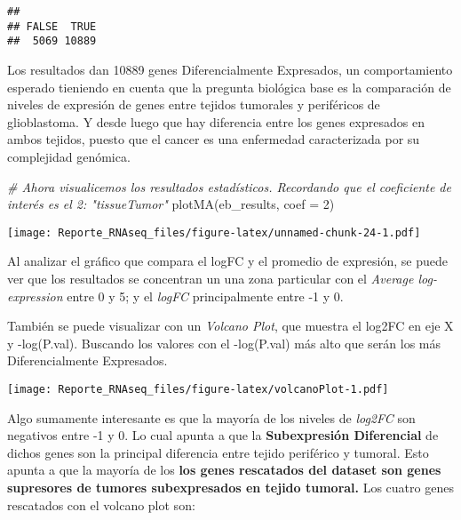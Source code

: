 \documentclass[
]{article}
\newenvironment{Shaded}{\begin{snugshade}}{\end{snugshade}}
\newcommand{\AttributeTok}[1]{\textcolor[rgb]{0.77,0.63,0.00}{#1}}
\newcommand{\CommentTok}[1]{\textcolor[rgb]{0.56,0.35,0.01}{\textit{#1}}}
\newcommand{\DecValTok}[1]{\textcolor[rgb]{0.00,0.00,0.81}{#1}}
\newcommand{\FunctionTok}[1]{\textcolor[rgb]{0.00,0.00,0.00}{#1}}
\newcommand{\NormalTok}[1]{#1}
\newcommand{\SpecialCharTok}[1]{\textcolor[rgb]{0.00,0.00,0.00}{#1}}
\begin{document}
\begin{verbatim}
## 
## FALSE  TRUE 
##  5069 10889
\end{verbatim}

Los resultados dan 10889 genes Diferencialmente Expresados, un
comportamiento esperado tieniendo en cuenta que la pregunta biológica
base es la comparación de niveles de expresión de genes entre tejidos
tumorales y periféricos de glioblastoma. Y desde luego que hay
diferencia entre los genes expresados en ambos tejidos, puesto que el
cancer es una enfermedad caracterizada por su complejidad genómica.

\begin{Shaded}
\begin{Highlighting}[]
\CommentTok{\# Ahora visualicemos los resultados estadísticos. Recordando que el coeficiente de interés es el 2: "tissueTumor"}
\FunctionTok{plotMA}\NormalTok{(eb\_results, }\AttributeTok{coef =} \DecValTok{2}\NormalTok{)}
\end{Highlighting}
\end{Shaded}

\texttt{[image: Reporte\_RNAseq\_files/figure-latex/unnamed-chunk-24-1.pdf]}

Al analizar el gráfico que compara el logFC y el promedio de expresión,
se puede ver que los resultados se concentran un una zona particular con
el \emph{Average log-expression} entre 0 y 5; y el \emph{logFC}
principalmente entre -1 y 0.

También se puede visualizar con un \emph{Volcano Plot}, que muestra el
log2FC en eje X y -log(P.val). Buscando los valores con el -log(P.val)
más alto que serán los más Diferencialmente Expresados.

\begin{Shaded}
\end{Shaded}

\texttt{[image: Reporte\_RNAseq\_files/figure-latex/volcanoPlot-1.pdf]}

Algo sumamente interesante es que la mayoría de los niveles de
\emph{log2FC} son negativos entre -1 y 0. Lo cual apunta a que la
\textbf{Subexpresión Diferencial} de dichos genes son la principal
diferencia entre tejido periférico y tumoral. Esto apunta a que la
mayoría de los \textbf{los genes rescatados del dataset son genes
supresores de tumores subexpresados en tejido tumoral.} Los cuatro genes
rescatados con el volcano plot son:
\end{document}

